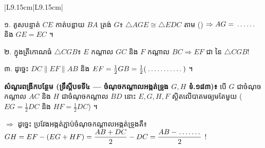 \documentclass[a4paper,10pt]{article}
\newcommand{\tri}[1]{\ensuremath{\triangle #1}}
\newcommand{\cg}{\ensuremath{\cong}}
\newcommand{\dotline}[1]{\makebox[#1]{\dotfill}}
\begin{document}
{\begin{tabular}{|L{9.15cm}|L{9.15cm}|}
\begin{center}
  \vspace{-2pt}
  \end{center}
  ១. គូសបន្ទាត់ $CE$ កាត់បន្លាយ $BA$ ត្រង់ $G$៖ $\tri{AGE}\cg\tri{EDC}$ តាម (\dotline{1.3cm}) $\Rightarrow AG = \dotline{1.0cm}$ និង $GE = EC$ ។\par
  ២. ក្នុងត្រីកោណធំ $\tri{CGB}$៖ $E$ កណ្ដាល $GC$ និង $F$ កណ្ដាល $BC \Rightarrow EF$ ជា \dotline{2.5cm} នៃ $\tri{CGB}$!\par
  ៣. ដូច្នេះ $DC\parallel EF\parallel AB$ និង $EF = \frac{1}{2}GB = \frac{1}{2}(\dotline{1.8cm})$ ។ \\
  \hline
\end{tabular}}\par\vspace{5pt}
\begin{tcolorbox}[enhanced, sharp corners, colback=panelgray, colframe=black, boxrule=0.65pt, top=3pt, bottom=3pt, left=6pt, right=6pt]
  \textbf{សំណួរពង្រីកបន្ថែម (ទ្រឹស្ដីបទទី៤ — ចំណុចកណ្ដាលអង្កត់ទ្រូង $G, H$ ទំ.១៨៣)៖} បើ $G$ ជាចំណុចកណ្ដាល $AC$ និង $H$ ជាចំណុចកណ្ដាល $BD$ នោះ $E, G, H, F$ ស្ថិតលើបាតមធ្យមតែមួយ ($EG = \frac{1}{2}DC$ និង $HF = \frac{1}{2}DC$) ។\par\vspace{2pt}
  $\Rightarrow$ ដូច្នេះ ប្រវែងអង្កត់ភ្ជាប់ចំណុចកណ្ដាលអង្កត់ទ្រូងគឺ៖ $GH = EF - (EG + HF) = \dfrac{AB+DC}{2} - DC = \dfrac{AB - \dotline{1.1cm}}{2}$ !
\end{tcolorbox}

\newpage
\end{document}
